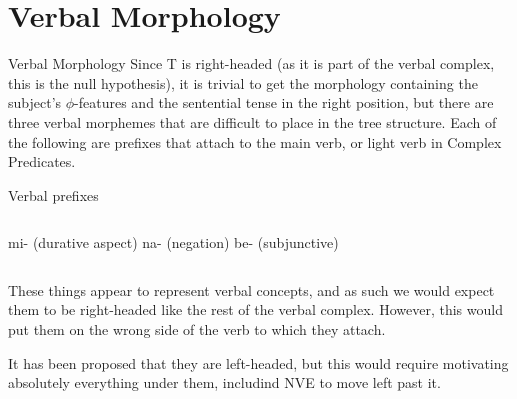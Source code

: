 \documentclass[10pt]{beamer}
\begin{document}
\section*{Verbal Morphology}


\begin{frame}[fragile]{Verbal Morphology}
  \pause
  Since T is right-headed (as it is part of the verbal complex, this is the null hypothesis), it is trivial to get the morphology containing the subject's $\phi$-features and the sentential tense in the right position, but there are three verbal morphemes that are difficult to place in the tree structure. Each of the following are prefixes that attach to the main verb, or light verb in Complex Predicates. 

  \begin{block}{Verbal prefixes}
    \vspace{5mm}
    \begin{columns}[T, onlytextwidth]
        mi- (durative aspect)
        na- (negation)
        be- (subjunctive)
    \end{columns}
  \end{block}
  \pause
  These things appear to represent verbal concepts, and as such we would expect them to be right-headed like the rest of the verbal complex. However, this would put them on the wrong side of the verb to which they attach.

  \pause
  It has been proposed that they are left-headed, but this would require motivating absolutely everything under them, includind NVE to move left past it. 

\end{frame}
\end{document}
